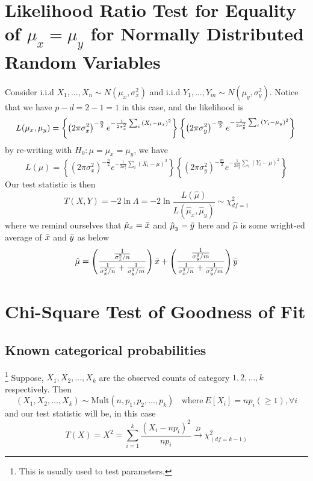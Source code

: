 \documentclass{article}
\begin{document}
\section{Likelihood Ratio Test for Equality of $\mu_x = \mu_y$ for Normally Distributed Random Variables}
Consider i.i.d $X_1,\ldots,X_n \sim N(\mu_x, \sigma_x^2)$ and i.i.d $Y_1,\ldots,Y_m \sim N(\mu_y, \sigma_y^2)$. Notice that we have $p-d = 2 - 1 = 1$ in this case, and the likelihood is
\begin{equation*}
    L(\mu_x, \mu_y) = \left\{\left(2\pi \sigma_x^2\right)^{-\frac{n}{2}}e^{-\frac{1}{2\sigma_x^2}\sum_i{\left(X_i - \mu_x\right)^2}}\right\} \left\{\left(2\pi \sigma_y^2\right)^{-\frac{m}{2}}e^{-\frac{1}{2\sigma_y^2}\sum_i{\left(Y_i - \mu_y\right)^2}}\right\} \\
\end{equation*}    
by re-writing with $H_0: \mu = \mu_x = \mu_y$, we have
\begin{equation*}
    L(\mu) = \left\{\left(2\pi \sigma_x^2\right)^{-\frac{n}{2}}e^{-\frac{1}{2\sigma_x^2}\sum_i{\left(X_i - \mu\right)^2}}\right\} \left\{\left(2\pi \sigma_y^2\right)^{-\frac{m}{2}}e^{-\frac{1}{2\sigma_y^2}\sum_i{\left(Y_i - \mu\right)^2}}\right\}
\end{equation*}
Our test statistic is then
\begin{equation*}
    T(X,Y) = -2 \ln \Lambda = -2 \ln \frac{L(\hat{\mu})}{L(\hat{\mu}_x, \hat{\mu}_y)} \sim \chi^2_{df = 1}
\end{equation*}
where we remind ourselves that $\hat{\mu}_x = \Bar{x}$ and $\hat{\mu}_y = \Bar{y}$ here and $\hat{\mu}$ is some wright-ed average of $\Bar{x}$ and $\Bar{y}$ as below
\begin{equation*}
    \hat{\mu} = \left( \frac{\frac{1}{\sigma^2_x/n}}{ \frac{1}{\sigma^2_x/n} + \frac{1}{\sigma^2_y/m} }\right)\Bar{x} + \left( \frac{\frac{1}{\sigma^2_y/m}}{ \frac{1}{\sigma^2_x/n} + \frac{1}{\sigma^2_y/m} }\right)\Bar{y}
\end{equation*}

\section{Chi-Square Test of Goodness of Fit}
\subsection{Known categorical probabilities}\footnote{This is usually used to test parameters.}
Suppose, $X_1, X_2, \ldots, X_k$ are the observed counts of category $1, 2, \ldots, k$ respectively. Then
\begin{equation*}
    (X_1, X_2, \ldots, X_k) \sim \text{Mult}(n, p_1, p_2, \ldots, p_k)~~~~\text{where}~E[X_i] = np_i (\geq 1), \forall i
\end{equation*}
and our test statistic will be, in this case
\begin{equation*}
    T(X) = X^2 = \sum_{i = 1}^k \frac{\left(X_i - np_i\right)^2}{np_i} \xrightarrow{D} \chi^2_{(df=k-1)}
\end{equation*}
\end{document}
